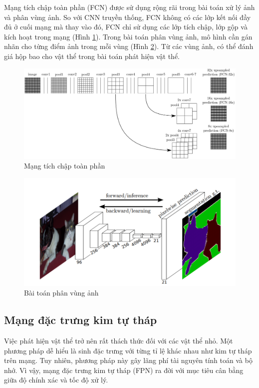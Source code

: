 Mạng tích chập toàn phần (FCN) được sử dụng rộng rãi trong bài toán xử lý ảnh và phân vùng ảnh. So với CNN truyền thống, FCN không có các lớp kết nối đầy đủ ở cuối mạng mà thay vào đó, FCN chỉ sử dụng các lớp tích chập, lớp gộp và kích hoạt trong mạng (Hình \ref{fig:fcn1}). Trong bài toán phân vùng ảnh, mô hình cần gán nhãn cho từng điểm ảnh trong mỗi vùng (Hình \ref{fig:fcn2}). Từ các vùng ảnh, có thể đánh giá hộp bao cho vật thể trong bài toán phát hiện vật thể.

\begin{figure}[h]
	\centering
	\includegraphics[width=0.99\linewidth]{images/fcn1}
	\caption{Mạng tích chập toàn phần}
	\label{fig:fcn1}
\end{figure}

\begin{figure}[h]
	\centering
	\includegraphics[width=0.9\linewidth]{images/fcn2}
	\caption{Bài toán phân vùng ảnh}
	\label{fig:fcn2}
\end{figure}




\subsection{Mạng đặc trưng kim tự tháp}

Việc phát hiện vật thể trở nên rất thách thức đối với các vật thể nhỏ. Một phương pháp dễ hiểu là sinh đặc trưng với từng tỉ lệ khác nhau như kim tự tháp trên mạng. Tuy nhiên, phương pháp này gây lãng phí tài nguyên tính toán và bộ nhớ. Vì vậy, mạng đặc trưng kim tự tháp (FPN) ra đời với mục tiêu cân bằng giữa độ chính xác và tốc độ xử lý.

